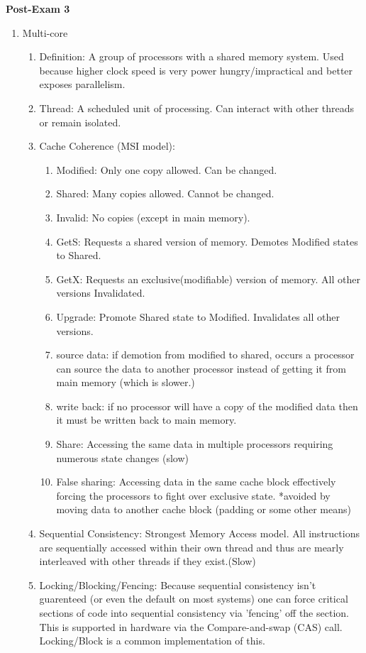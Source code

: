 \documentclass[12pt]{article}
\renewcommand{\=}[1]{\stackrel{#1}{=}} %
\theoremstyle{definition}
\theoremstyle{remark}
\begin{document}
  \textbf{Post-Exam 3}
  \begin{enumerate}
  \item Multi-core
    \begin{enumerate}
    \item Definition: A group of processors with a shared memory
      system. Used because higher clock speed is very power
      hungry/impractical and better exposes parallelism. 
    \item Thread: A scheduled unit of processing. Can interact with
      other threads or remain isolated.
    \item Cache Coherence (MSI model):
      \begin{enumerate}
      \item Modified: Only one copy allowed. Can be changed.
      \item Shared: Many copies allowed. Cannot be changed.
      \item Invalid: No copies (except in main memory).
      \item GetS: Requests a shared version of memory. Demotes
        Modified states to Shared.
      \item GetX: Requests an exclusive(modifiable) version of
        memory. All other versions Invalidated.
      \item Upgrade: Promote Shared state to Modified. Invalidates all
        other versions.
      \item source data: if demotion from modified to shared, occurs a
        processor can source the data to another processor instead of
        getting it from main memory (which is slower.)
      \item write back: if no processor will have a copy of the
        modified data then it must be written back to main memory.
      \item Share: Accessing the same data in multiple processors
        requiring numerous state changes (slow)
      \item False sharing: Accessing data in the same cache block
        effectively forcing the processors to fight over exclusive
        state. *avoided by moving data to another cache block (padding
        or some other means)
      \end{enumerate}

    \item Sequential Consistency: Strongest Memory Access model. All
      instructions are sequentially accessed within their own thread
      and thus are mearly interleaved with other threads if they exist.(Slow)
    \item Locking/Blocking/Fencing: Because sequential consistency
      isn't guarenteed (or even the default on most systems) one can
      force critical sections of code into sequential consistency via
      'fencing' off the section. This is supported in hardware via the
      Compare-and-swap (CAS) call. Locking/Block is a common
      implementation of this.
    \end{enumerate}


\end{enumerate}
\end{document}

